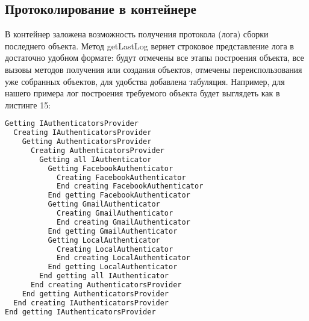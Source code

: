 \subsection{Протоколирование в контейнере}

В контейнер заложена возможность получения протокола (лога) сборки последнего объекта. Метод getLastLog вернет строковое представление лога в достаточно удобном формате:
будут отмечены все этапы построения объекта, все вызовы методов получения или создания объектов, отмечены переиспользования уже собранных объектов,
для удобства добавлена табуляция. Например, для нашего примера лог построения требуемого объекта будет выглядеть как в листинге 15:

\begin{lstlisting}[language=Java,caption={Пример лога получения экземпляра реализации интерфейса IAuthenticatorsProvider}]
Getting IAuthenticatorsProvider
  Creating IAuthenticatorsProvider
    Getting AuthenticatorsProvider
      Creating AuthenticatorsProvider
        Getting all IAuthenticator
          Getting FacebookAuthenticator
            Creating FacebookAuthenticator
            End creating FacebookAuthenticator
          End getting FacebookAuthenticator
          Getting GmailAuthenticator
            Creating GmailAuthenticator
            End creating GmailAuthenticator
          End getting GmailAuthenticator
          Getting LocalAuthenticator
            Creating LocalAuthenticator
            End creating LocalAuthenticator
          End getting LocalAuthenticator
        End getting all IAuthenticator
      End creating AuthenticatorsProvider
    End getting AuthenticatorsProvider
  End creating IAuthenticatorsProvider
End getting IAuthenticatorsProvider
\end{lstlisting}